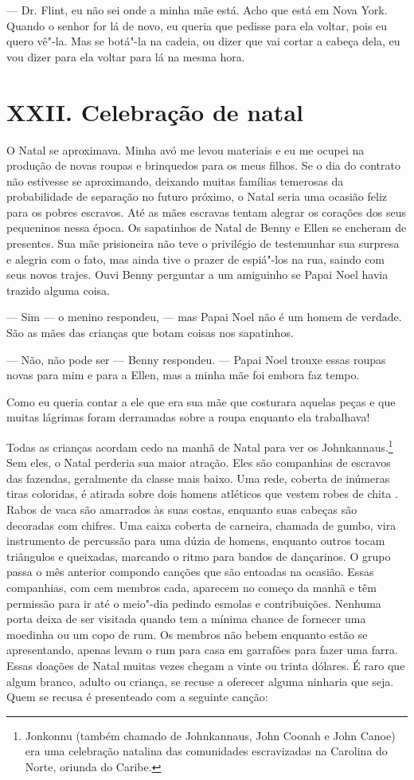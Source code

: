 --- Dr. Flint, eu não sei onde a minha mãe está. Acho que está em Nova
York. Quando o senhor for lá de novo, eu queria que pedisse para ela
voltar, pois eu quero vê"-la. Mas se botá"-la na cadeia, ou dizer que vai
cortar a cabeça dela, eu vou dizer para ela voltar para lá na mesma
hora.

\chapter{XXII. Celebração de
natal}

O Natal se aproximava. Minha avó me
levou materiais e eu me ocupei na produção de novas roupas e brinquedos
para os meus filhos. Se o dia do contrato não estivesse se aproximando,
deixando muitas famílias temerosas da probabilidade de separação no
futuro próximo, o Natal seria uma ocasião feliz para os pobres escravos.
Até as mães escravas tentam alegrar os corações dos seus pequeninos
nessa época. Os sapatinhos de Natal de Benny e Ellen se encheram de
presentes. Sua mãe prisioneira não teve o privilégio de testemunhar sua
surpresa e alegria com o fato, mas ainda tive o prazer de espiá"-los na
rua, saindo com seus novos trajes. Ouvi Benny perguntar a um amiguinho
se Papai Noel havia trazido alguma coisa.

--- Sim --- o menino respondeu, --- mas Papai Noel não é um homem de
verdade. São as mães das crianças que botam coisas nos sapatinhos.

--- Não, não pode ser --- Benny respondeu. --- Papai Noel trouxe essas
roupas novas para mim e para a Ellen, mas a minha mãe foi embora faz
tempo.

Como eu queria contar a ele que era sua
mãe que costurara aquelas peças e que muitas lágrimas foram derramadas
sobre a roupa enquanto ela trabalhava!

Todas as crianças acordam cedo na manhã
de Natal para ver os Johnkannaus.\footnote{Jonkonnu (também chamado de
  Johnkannaus, John Coonah e John Canoe) era uma celebração natalina das
  comunidades escravizadas na Carolina do Norte, oriunda do Caribe.} Sem
eles, o Natal perderia sua maior atração. Eles são companhias de
escravos das fazendas, geralmente da classe mais baixo. Uma rede,
coberta de inúmeras tiras coloridas, é atirada sobre dois homens
atléticos que vestem robes de chita . Rabos de vaca são amarrados às
suas costas, enquanto suas cabeças são decoradas com chifres. Uma caixa
coberta de carneira, chamada de gumbo, vira instrumento de percussão
para uma dúzia de homens, enquanto outros tocam triângulos e queixadas,
marcando o ritmo para bandos de dançarinos. O grupo passa o mês anterior
compondo canções que são entoadas na ocasião. Essas companhias, com cem
membros cada, aparecem no começo da manhã e têm permissão para ir até o
meio"-dia pedindo esmolas e contribuições. Nenhuma porta deixa de ser
visitada quando tem a mínima chance de fornecer uma moedinha ou um copo
de rum. Os membros não bebem enquanto estão se apresentando, apenas
levam o rum para casa em garrafões para fazer uma farra. Essas doações
de Natal muitas vezes chegam a vinte ou trinta dólares. É raro que algum
branco, adulto ou criança, se recuse a oferecer alguma ninharia que
seja. Quem se recusa é presenteado com a seguinte canção:

